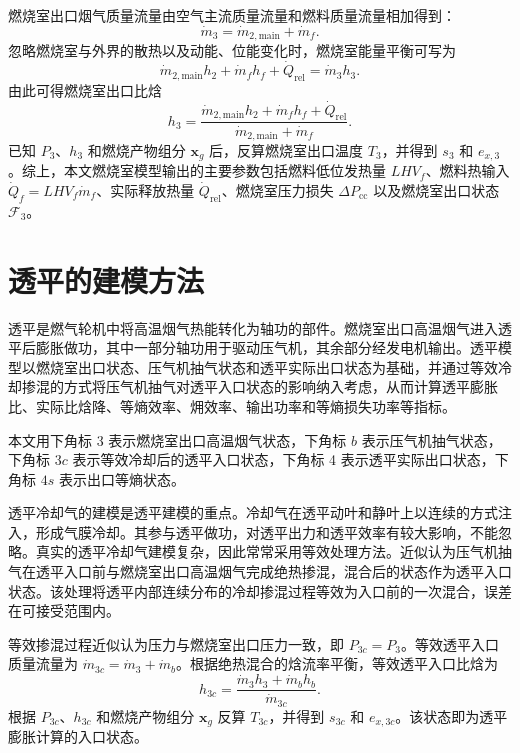 燃烧室出口烟气质量流量由空气主流质量流量和燃料质量流量相加得到：
\begin{equation}\label{eq:combustor-mass-balance}
\dot{m}_3
=
\dot{m}_{2,\mathrm{main}}
+
\dot{m}_f.
\end{equation}
忽略燃烧室与外界的散热以及动能、位能变化时，燃烧室能量平衡可写为
\begin{equation}\label{eq:combustor-energy-balance}
\dot{m}_{2,\mathrm{main}}h_2
+
\dot{m}_f h_f
+
\dot{Q}_{\mathrm{rel}}
=
\dot{m}_3 h_3.
\end{equation}
由此可得燃烧室出口比焓
\begin{equation}\label{eq:combustor-outlet-enthalpy}
h_3
=
\frac{
\dot{m}_{2,\mathrm{main}}h_2
+
\dot{m}_f h_f
+
\dot{Q}_{\mathrm{rel}}
}{
\dot{m}_{2,\mathrm{main}}+\dot{m}_f
}.
\end{equation}
已知 $P_3$、$h_3$ 和燃烧产物组分 $\boldsymbol{x}_{g}$ 后，反算燃烧室出口温度 $T_3$，并得到 $s_3$ 和 $e_{x,3}$。综上，本文燃烧室模型输出的主要参数包括燃料低位发热量 $LHV_f$、燃料热输入 $\dot{Q}_{f}=LHV_f\dot{m}_f$、实际释放热量 $\dot{Q}_{\mathrm{rel}}$、燃烧室压力损失 $\Delta P_{\mathrm{cc}}$ 以及燃烧室出口状态 $\mathcal{F}_3$。

\section{透平的建模方法}

透平是燃气轮机中将高温烟气热能转化为轴功的部件。燃烧室出口高温烟气进入透平后膨胀做功，其中一部分轴功用于驱动压气机，其余部分经发电机输出。透平模型以燃烧室出口状态、压气机抽气状态和透平实际出口状态为基础，并通过等效冷却掺混的方式将压气机抽气对透平入口状态的影响纳入考虑，从而计算透平膨胀比、实际比焓降、等熵效率、㶲效率、输出功率和等熵损失功率等指标。

本文用下角标 3 表示燃烧室出口高温烟气状态，下角标 $b$ 表示压气机抽气状态，下角标 $3c$ 表示等效冷却后的透平入口状态，下角标 4 表示透平实际出口状态，下角标 $4s$ 表示出口等熵状态。

透平冷却气的建模是透平建模的重点。冷却气在透平动叶和静叶上以连续的方式注入，形成气膜冷却。其参与透平做功，对透平出力和透平效率有较大影响，不能忽略。真实的透平冷却气建模复杂，因此常常采用等效处理方法。近似认为压气机抽气在透平入口前与燃烧室出口高温烟气完成绝热掺混，混合后的状态作为透平入口状态。该处理将透平内部连续分布的冷却掺混过程等效为入口前的一次混合，误差在可接受范围内。


等效掺混过程近似认为压力与燃烧室出口压力一致，即 $P_{3c}=P_3$。等效透平入口质量流量为 $\dot{m}_{3c}=\dot{m}_3+\dot{m}_b$。根据绝热混合的焓流率平衡，等效透平入口比焓为
\begin{equation}\label{eq:turbine-cooling-mix}
h_{3c}
=
\frac{
\dot{m}_3 h_3
+
\dot{m}_b h_b
}{
\dot{m}_{3c}
}.
\end{equation}
根据 $P_{3c}$、$h_{3c}$ 和燃烧产物组分 $\boldsymbol{x}_g$ 反算 $T_{3c}$，并得到 $s_{3c}$ 和 $e_{x,3c}$。该状态即为透平膨胀计算的入口状态。

